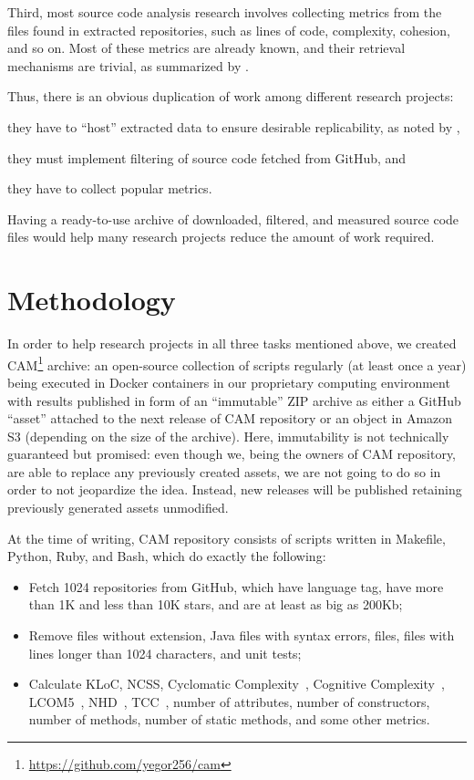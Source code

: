 \documentclass[11pt,sigplan,nonacm]{acmart}
\begin{document}
Third, most source code analysis research involves collecting metrics from the files found in extracted repositories, such as lines of code, complexity, cohesion, and so on. Most of these metrics are already known, and their retrieval mechanisms are trivial, as summarized by \citet{nunez2017source}.

Thus, there is an obvious duplication of work among different research projects:
\begin{inparaenum}[(a)]
\item they have to ``host'' extracted data to ensure desirable replicability, as noted by \citet{7887704},
\item they must implement filtering of source code fetched from GitHub, and
\item they have to collect popular metrics.
\end{inparaenum}
Having a ready-to-use archive of downloaded, filtered, and measured source code files would help many research projects reduce the amount of work required.

\section{Methodology}

In order to help research projects in all three tasks mentioned above, we created CAM\footnote{\url{https://github.com/yegor256/cam}} archive: an open-source collection of scripts regularly (at least once a year) being executed in Docker containers in our proprietary computing environment with results published in form of an ``immutable'' ZIP archive as either a GitHub ``asset'' attached to the next release of CAM repository or an object in Amazon S3 (depending on the size of the archive). Here, immutability is not technically guaranteed but promised: even though we, being the owners of CAM repository, are able to replace any previously created assets, we are not going to do so in order to not jeopardize the idea. Instead, new releases will be published retaining previously generated assets unmodified.

At the time of writing, CAM repository consists of scripts written in Makefile, Python, Ruby, and Bash, which do exactly the following:
\begin{itemize}
    \item Fetch 1024 repositories from GitHub, which have  language tag, have more than 1K and less than 10K stars, and are at least as big as 200Kb;
    \item Remove files without  extension, Java files with syntax errors,  files, files with lines longer than 1024 characters, and unit tests;
    \item Calculate KLoC, NCSS, Cyclomatic Complexity~\citep{mccabe1976complexity}, Cognitive Complexity~\citep{campbell2018cognitive}, LCOM5~\citep{henderson1996coupling}, NHD~\citep{counsell2006interpretation}, TCC~\citep{bieman1995cohesion}, number of attributes, number of constructors, number of methods, number of static methods, and some other metrics.
\end{itemize}
\end{document}
